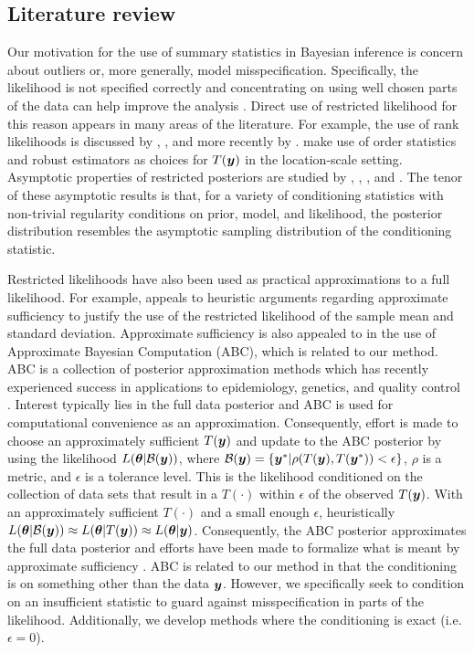 \documentclass[ba]{imsart}
\def\bth{\mbox{\boldmath $\theta$}}
\newcommand{\by}{\mbox{\boldmath $y$}}
\begin{document}
\subsection{Literature review}

Our motivation for the use of summary statistics in Bayesian inference is concern about outliers or, more generally, model misspecification. Specifically, the likelihood is not specified correctly and concentrating on using well chosen parts of the data can help improve the analysis \citep[e.g.,][]{wong2004}. Direct use of restricted likelihood for this reason appears in many areas of the literature.  For example, the use of rank likelihoods is discussed by \cite{savage1969}, \cite{pettitt1983, pettitt1982}, and more recently by \cite{hoff2013}.  
\cite{lewis2012} make use of order statistics and robust estimators as choices for $T(\by)$ in the location-scale setting. 
Asymptotic properties of restricted posteriors are studied by \cite{doksum1990}, \cite{clarke1995}, \cite{yuan2004},  and \cite{hwang2005}. The tenor of these asymptotic results is that, for a variety of conditioning statistics with non-trivial regularity conditions on prior, model, and likelihood, the
posterior distribution resembles the asymptotic sampling distribution of the conditioning statistic.  

Restricted likelihoods have also been used as practical approximations to a full likelihood. For example, \cite{pratt1965} appeals to heuristic arguments regarding approximate sufficiency to justify the use of the restricted likelihood of the sample mean and standard deviation. Approximate sufficiency is also appealed to in the use of Approximate Bayesian Computation (ABC), which is related to our method.  
ABC is a collection of posterior approximation methods which has recently experienced success in applications to epidemiology, genetics, and quality control \citep[see, for example,][]{tavare1997, pritchard1999,  marjoram2003, fearnhead2012}. Interest typically lies in the full data posterior and ABC is used for computational convenience as an approximation.  Consequently, effort is made to choose an approximately sufficient $T(\by)$ and update to the ABC posterior by using the likelihood $L(\bth| \mathcal{B}(\by))$, where $\mathcal{B}(\by)=\{\by^{*}|\rho(T(\by),T(\by^{*}))<\epsilon\}$, $\rho$ is a metric, and $\epsilon$ is a tolerance level. This is the likelihood conditioned on the collection of data sets that result in a $T(\cdot)$ within $\epsilon$ of the observed $T(\by)$. %
With an approximately sufficient $T(\cdot)$ and a small enough $\epsilon$, heuristically  $L(\bth|\mathcal{B}(\by))\approx L(\bth|T(\by))\approx L(\bth|\by)$. Consequently, the ABC posterior approximates the full data posterior and efforts have been made to formalize what is meant by  approximate sufficiency \citep[e.g.,][]{joyce2008}. ABC is related to our method in that the conditioning is on something other than the data $\by$.  However, we specifically seek to condition on an insufficient statistic to guard against misspecification in parts of the likelihood. Additionally, we develop methods where the conditioning is exact (i.e. $\epsilon = 0$).
\end{document}
